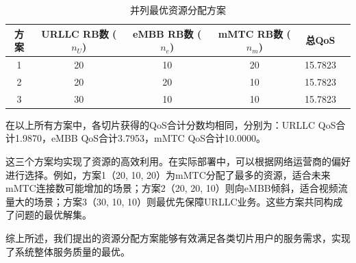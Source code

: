 \begin{table}[H]
\centering
\caption{并列最优资源分配方案}
\label{tab:q1_best_solutions}
\begin{tabular}{cccccc}
\hline
\textbf{方案} & \textbf{URLLC RB数 ($n_U$)} & \textbf{eMBB RB数 ($n_e$)} & \textbf{mMTC RB数 ($n_m$)} & \textbf{总QoS} \\
\hline
1 & 20 & 10 & 20 & 15.7823 \\
2 & 20 & 20 & 10 & 15.7823 \\
3 & 30 & 10 & 10 & 15.7823 \\
\hline
\end{tabular}
\end{table}

在以上所有方案中，各切片获得的QoS合计分数均相同，分别为：URLLC QoS合计1.9870，eMBB QoS合计3.7953，mMTC QoS合计10.0000。

 这三个方案均实现了资源的高效利用。在实际部署中，可以根据网络运营商的偏好进行选择。例如，方案1（20, 10, 20）为mMTC分配了最多的资源，适合未来mMTC连接数可能增加的场景；方案2（20, 20, 10）则向eMBB倾斜，适合视频流量大的场景；方案3（30, 10, 10）则最优先保障URLLC业务。这些方案共同构成了问题的最优解集。


综上所述，我们提出的资源分配方案能够有效满足各类切片用户的服务需求，实现了系统整体服务质量的最优。